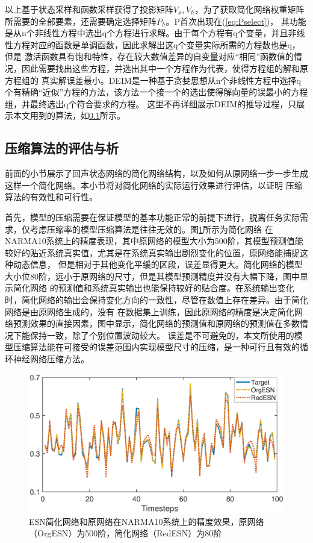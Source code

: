 以上基于状态采样和函数采样获得了投影矩阵\(V_x,V_h\)，为了获取简化网络权重矩阵所需要的全部要素，还需要确定选择矩阵\(P_h\)。P首次出现在(\ref{eq:Pselect})，
其功能是从n个非线性方程中选出q个方程进行求解。由于每个方程有q个变量，并且非线性方程对应的函数是单调函数，因此求解出这q个变量实际所需的方程数也是q，但是
激活函数具有饱和特性，存在较大数值差异的自变量对应“相同”函数值的情况，因此需要找出这些方程，并选出其中一个方程作为代表，使得方程组的解和原方程组的
真实解误差最小。DEIM是一种基于贪婪思想从n个非线性方程中选择q个有精确“近似”方程的方法，该方法一个接一个的选出使得解向量的误最小的方程组，并最终选出q个符合要求的方程。
这里不再详细展示DEIM的推导过程，只展示本文用到的算法，如\ref{}所示。
\subsection{压缩算法的评估与析}
前面的小节展示了回声状态网络的简化网络结构，以及如何从原网络一步一步生成这样一个简化网络。本小节将对简化网络的实际运行效果进行评估，以证明
压缩算法的有效性和可行性。

首先，模型的压缩需要在保证模型的基本功能正常的前提下进行，脱离任务实际需求，仅考虑压缩率的模型压缩算法是往往无效的。图\ref{fig:accuracy}所示为简化网络
在NARMA10系统上的精度表现，其中原网络的模型大小为500阶，其模型预测值能较好的贴近系统真实值，尤其是在系统真实输出剧烈变化的位置，原网络能捕捉这种动态信息，
但是相对于其他变化平缓的区段，误差显得更大。简化网络的模型大小位80阶，远小于原网络的尺寸，但是其模型预测精度并没有大幅下降，图中显示简化网络
的预测值和系统真实输出也能保持较好的贴合度。在系统输出变化时，简化网络的输出会保持变化方向的一致性，尽管在数值上存在差异。由于简化网络是由原网络生成的，没有
在数据集上训练，因此原网络的精度是决定简化网络预测效果的直接因素，图中显示，简化网络的预测值和原网络的预测值在多数情况下能保持一致，除了个别位置波动较大。
误差是不可避免的，本文所使用的模型压缩算法能在可接受的误差范围内实现模型尺寸的压缩，是一种可行且有效的循环神经网络压缩方法。
\begin{figure}
	\centering
	\includegraphics[width=1.0\columnwidth]{exp/500&80_all.eps}
	\caption{ESN简化网络和原网络在NARMA10系统上的精度效果，原网络（OrgESN）为500阶，简化网络（RedESN）为80阶}
	\label{fig:accuracy}
\end{figure}

